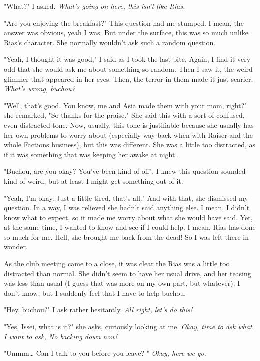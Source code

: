 \documentclass{article}
\begin{document}
"What?" I asked. \emph{What's going on here, this isn't like Rias.}

"Are you enjoying the breakfast?" This question had me stumped. I mean, the answer was obvious, yeah I was. But under the surface, this was so much unlike Rias's character. She normally wouldn't ask such a random question.

"Yeah, I thought it was good," I said as I took the last bite. Again, I find it very odd that she would ask me about something so random. Then I saw it, the weird glimmer that appeared in her eyes. Then, the terror in them made it just scarier. \emph{What's wrong, buchou?}

"Well, that's good. You know, me and Asia made them with your mom, right?" she remarked, "So thanks for the praise." She said this with a sort of confused, even distracted tone. Now, usually, this tone is justifiable because she usually has her own problems to worry about (especially way back when with Raiser and the whole Factions business), but this was different. She was a little too distracted, as if it was something that was keeping her awake at night.

"Buchou, are you okay? You've been kind of off". I knew this question sounded kind of weird, but at least I might get something out of it.

"Yeah, I'm okay. Just a little tired, that's all." And with that, she dismissed my question. In a way, I was relieved she hadn't said anything else. I mean, I didn't know what to expect, so it made me worry about what she would have said. Yet, at the same time, I wanted to know and see if I could help. I mean, Rias has done so much for me. Hell, she brought me back from the dead! So I was left there in wonder.

\noindent\makebox[\linewidth]{\rule{\textwidth}{0.4pt}}

As the club meeting came to a close, it was clear the Rias was a little too distracted than normal. She didn't seem to have her usual drive, and her teasing was less than usual (I guess that was more on my own part, but whatever). I don't know, but I suddenly feel that I have to help buchou.

"Hey, buchou?" I ask rather hesitantly. \emph{All right, let's do this!}

"Yes, Issei, what is it?" she asks, curiously looking at me. \emph{Okay, time to ask what I want to ask, No backing down now!}

"Ummm… Can I talk to you before you leave? " \emph{Okay, here we go.}
\end{document}
